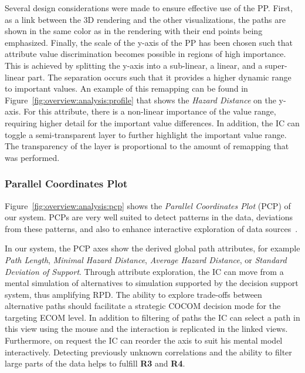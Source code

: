 \documentclass{egpubl}
\begin{document}
Several design considerations were made to ensure effective use of the PP. First, as a link between the 3D rendering and the other visualizations, the paths are shown in the same color as in the rendering with their end points being emphasized. Finally, the scale of the y-axis of the PP has been chosen such that attribute value discrimination becomes possible in regions of high importance. This is achieved by splitting the y-axis into a sub-linear, a linear, and a super-linear part. The separation occurs such that it provides a higher dynamic range to important values. An example of this remapping can be found in Figure~\ref{fig:overview:analysis:profile} that shows the \emph{Hazard Distance} on the y-axis. For this attribute, there is a non-linear importance of the value range, requiring higher detail for the important value differences. In addition, the IC can toggle a semi-transparent layer to further highlight the important value range. The transparency of the layer is proportional to the amount of remapping that was performed.

\subsubsection{Parallel Coordinates Plot} \label{sec:overview:analysis:pcp}
Figure~\ref{fig:overview:analysis:pcp} shows the \emph{Parallel Coordinates Plot} (PCP) of our system. PCPs are very well suited to detect patterns in the data, deviations from these patterns, and also to enhance interactive exploration of data sources~\cite{Tory05aparallel}.

In our system, the PCP axes show the derived global path attributes, for example \emph{Path Length}, \emph{Minimal Hazard Distance}, \emph{Average Hazard Distance}, or \emph{Standard Deviation of Support}. Through attribute exploration, the IC can move from a mental simulation of alternatives to simulation supported by the decision support system, thus amplifying RPD. The ability to explore trade-offs between alternative paths should facilitate a strategic COCOM decision mode for the targeting ECOM level. In addition to filtering of paths the IC can select a path in this view using the mouse and the interaction is replicated in the linked views. Furthermore, on request the IC can reorder the axis to suit his mental model interactively. Detecting previously unknown correlations and the ability to filter large parts of the data helps to fulfill {\bfseries R3} and {\bfseries R4}.
\end{document}
